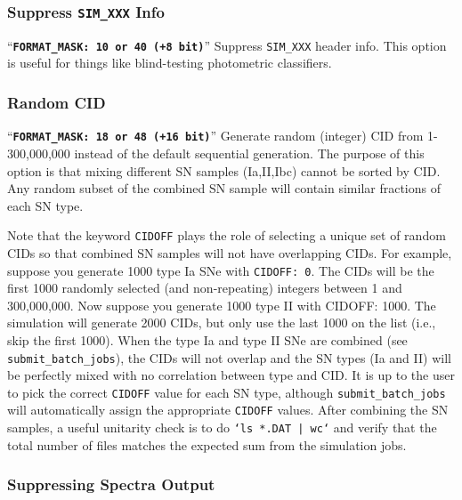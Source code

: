 \documentclass[12pt]{article}
\newcommand{\MXSIM}{300,000,000}
\begin{document}
   \subsubsection{Suppress {\tt SIM\_XXX} Info}
   \label{sss:blind_test}
``{\tt\bf FORMAT\_MASK: 10 or 40 (+8 bit)}'' 
Suppress {\tt SIM\_XXX} header info. This option is
useful for things like blind-testing photometric
classifiers.

   \subsubsection{Random CID}
   \label{sss:random_CID}
``{\tt\bf FORMAT\_MASK: 18 or 48 (+16 bit)}'' 
Generate random (integer) CID  from 1-{\MXSIM} instead
of the default sequential generation.
The purpose of this option is that mixing different SN samples 
(Ia,II,Ibc) cannot be sorted by CID. Any random subset of the
combined SN sample will contain similar fractions of each 
SN type.

Note that the keyword {\tt CIDOFF} plays the role of selecting
a unique set of random CIDs so that combined SN samples will 
not have overlapping CIDs. 
For example, suppose you generate 1000 type Ia SNe with {\tt CIDOFF: 0}. 
The CIDs will be the first 1000 randomly
selected (and non-repeating) integers between 1 and \MXSIM.
Now suppose you generate 1000 type II with {CIDOFF: 1000}.
The simulation will generate 2000 CIDs, but only use the last
1000 on the list (i.e., skip the first 1000).
When the type Ia and type II SNe are combined
(see {\tt submit\_batch\_jobs}), the CIDs will not overlap
and the SN types (Ia and II) will be perfectly mixed with no correlation
between type and CID. It is up to the user to pick the correct
{\tt CIDOFF} value for each SN type, although {\tt submit\_batch\_jobs}
will automatically assign the appropriate {\tt CIDOFF} values.
After combining the SN samples, a useful unitarity check is to do 
{\tt `ls *.DAT | wc`}
and verify that the total number of files matches the expected 
sum from the simulation jobs.

\subsubsection{Suppressing Spectra Output}
\label{sss:suppress_spectra}
\end{document}

